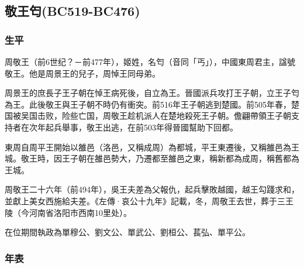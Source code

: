 
\subsection{敬王匄\tiny{(BC519-BC476)}}

\subsubsection{生平}

周敬王（前6世纪？－前477年），姬姓，名匄（音同「丐」），中國東周君主，諡號敬王。他是周景王的兒子，周悼王同母弟。

周景王的庶長子王子朝在悼王病死後，自立為王。晉國派兵攻打王子朝，立王子匄為王。此後敬王與王子朝不時仍有衝突。前516年王子朝逃到楚國。前505年春，楚国被吴国击败，险些亡国，周敬王趁机派人在楚地殺死王子朝。儋翩帶領王子朝支持者在次年起兵舉事，敬王出逃，在前503年得晉國幫助下回都。

東周自周平王開始以雒邑（洛邑，又稱成周）為都城，平王東遷後，又稱雒邑為王城。敬王時，因王子朝在雒邑勢大，乃遷都至雒邑之東，稱新都為成周，稱舊都為王城。

周敬王二十六年（前494年），吳王夫差為父報仇，起兵擊敗越國，越王勾踐求和，並獻上美女西施給夫差。《左傳·哀公十九年》記載，冬，周敬王去世，葬于三王陵（今河南省洛阳市西南10里处）。

在位期間執政為單穆公、劉文公、單武公、劉桓公、萇弘、單平公。

\subsubsection{年表}

